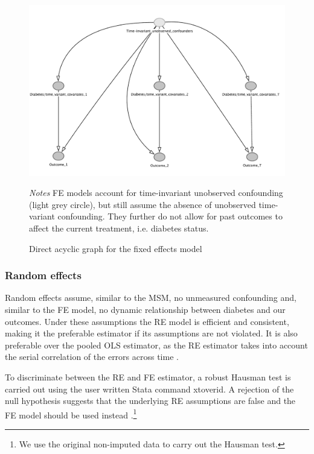 \begin{figure}[!p]
\begin{center}
\caption{\label{fig:DAG_fe} Direct acyclic graph for the fixed effects model}
\includegraphics[width=\linewidth]{Chapter5/DAG/dag_fe_alt_corrections}
\end{center}
\footnotesize{\textit{Notes} \ac{FE} models account for time-invariant unobserved confounding (light grey circle), but still assume the absence of unobserved time-variant confounding. They further do not allow for past outcomes to affect the current treatment, i.e. diabetes status.}
\end{figure}


\subsubsection{Random effects}

Random effects assume, similar to the \ac{MSM}, no unmeasured confounding and, similar to the \ac{FE} model, no dynamic relationship between diabetes and our outcomes. Under these assumptions the \ac{RE} model is efficient and consistent, making it the preferable estimator if its assumptions are not violated. It is also preferable over the pooled \ac{OLS} estimator, as the \ac{RE} estimator takes into account the serial correlation of the errors across time \parencite{Wooldridge2012}. 

To discriminate between the \ac{RE} and \ac{FE} estimator, a robust Hausman test is carried out using the user written Stata command xtoverid. A rejection of the null hypothesis suggests that the underlying \ac{RE} assumptions are false and the \ac{FE} model should be used instead \parencite{Wooldridge2012}.\footnote{We use the original non-imputed data to carry out the Hausman test.} 



